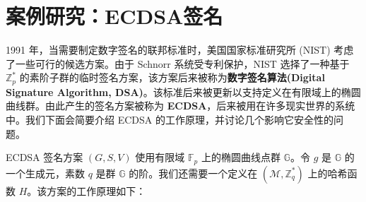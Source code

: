 \section{案例研究：ECDSA签名}

1991 年，当需要制定数字签名的联邦标准时，美国国家标准研究所 (NIST) 考虑了一些可行的候选方案。由于 Schnorr 系统受专利保护，NIST 选择了一种基于 $\mathbb{Z}_p^*$ 的素阶子群的临时签名方案，该方案后来被称为\textbf{数字签名算法(Digital Signature Algorithm, DSA)}。该标准后来被更新以支持定义在有限域上的椭圆曲线群。由此产生的签名方案被称为 \textbf{ECDSA}，后来被用在许多现实世界的系统中。我们下面会简要介绍 ECDSA 的工作原理，并讨论几个影响它安全性的问题。

ECDSA 签名方案 $(G,S,V)$ 使用有限域 $\mathbb{F}_p$ 上的椭圆曲线点群 $\mathbb{G}$。令 $g$ 是 $\mathbb{G}$ 的一个生成元，素数 $q$ 是群 $\mathbb{G}$ 的阶。我们还需要一个定义在 $(\mathcal{M},\mathbb{Z}_q^*)$ 上的哈希函数 $H$。该方案的工作原理如下：
